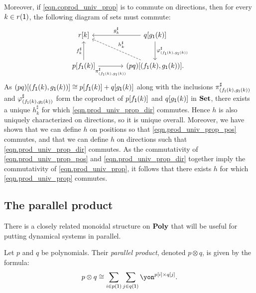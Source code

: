 \documentclass[Book-Poly]{subfiles}
\begin{document}
\begin{exercise}
\begin{solution}
Moreover, if \eqref{eqn.coprod_univ_prop} is to commute on directions, then for every $k \in r(\textsf{1})$, the following diagram of sets must commute:
\begin{equation} \label{eqn.prod_univ_prop_dir}
\begin{tikzcd}[sep=large]
	r[k] & q[g_\1(k)] \ar[l, "g^\sharp_k"'] \ar[d, "\varphi^\sharp_{(f_\1(k), g_\1(k))}"] \\
	p[f_\1(k)] \ar[u, "f^\sharp_k"] \ar[r, "\pi^\sharp_{(f_\1(k), g_\1(k))}"'] & (pq)[(f_\1(k), g_\1(k))]. \ar[ul, "h^\sharp_k"', dashed] 
\end{tikzcd}
\end{equation}
As $(pq)[(f_{\textsf{1}}(k), g_{\textsf{1}}(k))] \cong p[f_{\textsf{1}}(k)] + q[g_{\textsf{1}}(k)]$ along with the inclusions $\pi^\sharp_{(f_{\textsf{1}}(k), g_{\textsf{1}}(k))}$ and $\varphi^\sharp_{(f_{\textsf{1}}(k), g_{\textsf{1}}(k))}$ form the coproduct of $p[f_{\textsf{1}}(k)]$ and $q[g_{\textsf{1}}(k)]$ in $\mathbf{Set}$, there exists a unique $h^\sharp_k$ for which \eqref{eqn.prod_univ_prop_dir} commutes.
Hence $h$ is also uniquely characterized on directions, so it is unique overall.
Moreover, we have shown that we can define $h$ on positions so that \eqref{eqn.prod_univ_prop_pos} commutes, and that we can define $h$ on directions such that \eqref{eqn.prod_univ_prop_dir} commutes.
As the commutativity of \eqref{eqn.prod_univ_prop_pos} and \eqref{eqn.prod_univ_prop_dir} together imply the commutativity of \eqref{eqn.prod_univ_prop}, it follows that there exists $h$ for which \eqref{eqn.prod_univ_prop} commutes.
\end{solution}
\end{exercise}

\subsection{The parallel product} \label{subsec.poly.func_nat.monoidal.par}
There is a closely related monoidal structure on $\mathbf{Poly}$ that will be useful for putting dynamical systems in parallel.

\begin{definition} \label{def.parallel}
Let $p$ and $q$ be polynomials. Their \emph{parallel product}, denoted $p\otimes q$, is given by the formula:
\begin{equation}\label{eqn.parallel_def}
p\otimes q\iso\sum_{i\in p(\1)}\sum_{j\in q(\1)}\yon^{p[i]\times q[j]}.
\end{equation}
\end{definition}
\end{document}

